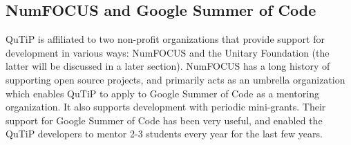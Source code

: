 \documentclass[preprint,3p,sort&compress]{elsarticle}
\begin{document}
\subsection{NumFOCUS and Google Summer of Code} \label{subsec:gsoc}

QuTiP is affiliated to two non-profit organizations that provide support for development in various ways: NumFOCUS and the Unitary Foundation (the latter will be discussed in a later section).  NumFOCUS has a long history of supporting open source projects, and primarily acts as an umbrella organization which enables QuTiP to apply to Google Summer of Code as a mentoring organization.  It also supports development with periodic mini-grants. Their support for Google Summer of Code has been very useful, and enabled the QuTiP developers to mentor 2-3 students every year for the last few years. 

\end{document}
